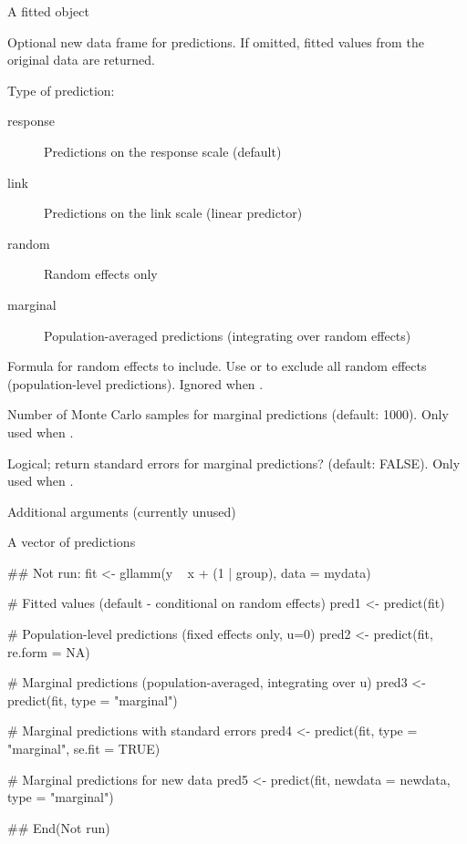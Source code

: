 \documentclass[a4paper]{book}
\begin{document}
\begin{Arguments}
\begin{ldescription}
\item[\code{object}] A fitted  object

\item[\code{newdata}] Optional new data frame for predictions. If omitted, fitted
values from the original data are returned.

\item[\code{type}] Type of prediction:
\begin{description}

\item[response] Predictions on the response scale (default)
\item[link] Predictions on the link scale (linear predictor)
\item[random] Random effects only
\item[marginal] Population-averaged predictions (integrating over random effects)

\end{description}


\item[\code{re.form}] Formula for random effects to include. Use  or
 to exclude all random effects (population-level predictions).
Ignored when .

\item[\code{n\_sim}] Number of Monte Carlo samples for marginal predictions (default: 1000).
Only used when .

\item[\code{se.fit}] Logical; return standard errors for marginal predictions? (default: FALSE).
Only used when .

\item[\code{...}] Additional arguments (currently unused)
\end{ldescription}
\end{Arguments}
%
\begin{Value}
A vector of predictions
\end{Value}
%
\begin{Examples}
\begin{ExampleCode}
## Not run: 
fit <- gllamm(y ~ x + (1 | group), data = mydata)

# Fitted values (default - conditional on random effects)
pred1 <- predict(fit)

# Population-level predictions (fixed effects only, u=0)
pred2 <- predict(fit, re.form = NA)

# Marginal predictions (population-averaged, integrating over u)
pred3 <- predict(fit, type = "marginal")

# Marginal predictions with standard errors
pred4 <- predict(fit, type = "marginal", se.fit = TRUE)

# Marginal predictions for new data
pred5 <- predict(fit, newdata = newdata, type = "marginal")

## End(Not run)

\end{ExampleCode}
\end{Examples}
\end{document}

